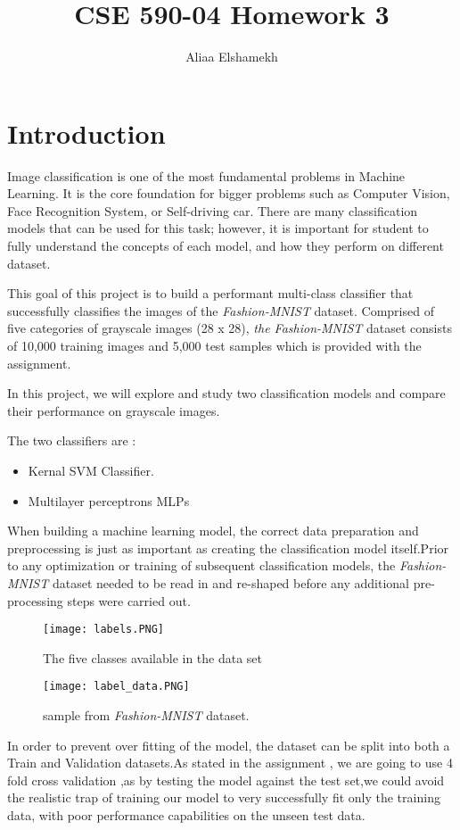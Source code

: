\documentclass{article}
\title{CSE 590-04 Homework 3 }
\author{Aliaa Elshamekh}
\begin{document}
	\maketitle
	\section{Introduction}
	Image classification is one of the most fundamental problems in Machine Learning. It is the core foundation for bigger problems such as Computer Vision, Face Recognition System, or Self-driving car. There are many classification models that can be used for this task; however, it is important for student to fully understand the concepts of each model, and how they perform on different dataset.
	
	
	This goal of this project is to build a performant multi-class classifier that successfully classifies the images of the  \textit{Fashion-MNIST} dataset. Comprised of five categories of grayscale images (28 x 28), \textit{the Fashion-MNIST} dataset consists of 10,000 training images and 5,000 test samples which is provided with the assignment.
	
	In this project, we will explore and study two classification models and compare their performance on grayscale images.
	
	The two classifiers are :
	\begin{itemize}
		\item Kernal SVM Classifier.
		\item Multilayer perceptrons MLPs
	\end{itemize}
	
	When building a machine learning model, the correct data preparation and preprocessing is just as important as creating the classification model itself.Prior to any optimization or training of subsequent classification models, the \textit{Fashion-MNIST} dataset needed to be read in and re-shaped before any additional pre-processing steps were carried out.
	\begin{figure}[H]
		\centering
		\begin{minipage}{0.45\textwidth}
			\centering
			\texttt{[image: labels.PNG]}\caption{{\small The five classes available in the data set }}
			\label{fig:label}
		\end{minipage}\hfill
		\begin{minipage}{0.45\textwidth}
			\centering
			\texttt{[image: label\_data.PNG]}\caption{{\small sample from \textit{Fashion-MNIST} dataset.}}
			\label{fig:labelData}
		\end{minipage}
	\end{figure}
	In order to prevent over fitting of the model, the dataset can be split into both a Train and Validation datasets.As stated in the assignment , we are going to use 4 fold cross validation ,as by testing the model against the test set,we could avoid the realistic trap of training our model to very successfully fit only the training data, with poor performance capabilities on the unseen test data.
	
\end{document}
